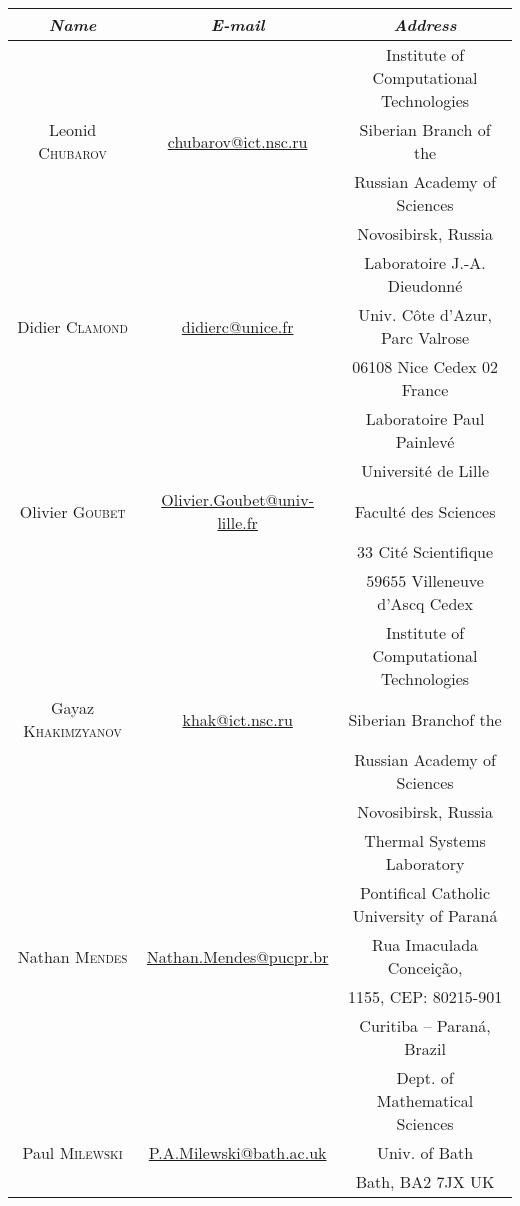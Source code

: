 \documentclass[final, a4paper, oneside, 12pt]{article}
\numberwithin{equation}{section}
\begin{document}
\bigskip

\begin{adjustwidth}{-1cm}{}
\begin{tabular}{ccc}
\hline\hline
\textit{Name} & \textit{E-mail} & \textit{Address} \\
\hline\hline 
& & Institute of Computational Technologies \\
Leonid \textsc{Chubarov} & \href{mailto:chubarov@ict.nsc.ru}{chubarov@ict.nsc.ru} & Siberian Branch of the \\
& & Russian Academy of Sciences \\
& & Novosibirsk, Russia \\
\hline
 & & Laboratoire J.-A. Dieudonn\'e \\
Didier \textsc{Clamond} & \href{mailto:didierc@unice.fr}{didierc@unice.fr} & Univ. C\^ote d'Azur, Parc Valrose \\
& & 06108 Nice Cedex 02 France \\
\hline
& & Laboratoire Paul Painlev\'e \\
& & Universit\'e de Lille \\
Olivier \textsc{Goubet} & \href{mailto:Olivier.Goubet@univ-lille.fr}{Olivier.Goubet@univ-lille.fr} & Facult\'e des Sciences \\
& & $33$ Cit\'e Scientifique \\
& & $59655$ Villeneuve d'Ascq Cedex​ \\
\hline
& & Institute of Computational Technologies \\
Gayaz \textsc{Khakimzyanov} & \href{mailto:khak@ict.nsc.ru}{khak@ict.nsc.ru} & Siberian Branchof the \\
& & Russian Academy of Sciences \\
& & Novosibirsk, Russia \\
\hline
& & Thermal Systems Laboratory \\
& & Pontifical Catholic University of Paran\'a \\
Nathan \textsc{Mendes} & \href{mailto:nathan.mendes@pucpr.br}{Nathan.Mendes@pucpr.br} & Rua Imaculada Concei\c{c}\~{a}o, \\
& & 1155, CEP: 80215-901 \\
& & Curitiba -- Paran\'a, Brazil \\
\hline
 & & Dept. of Mathematical Sciences \\
Paul \textsc{Milewski} & \href{mailto:P.A.Milewski@bath.ac.uk}{P.A.Milewski@bath.ac.uk} & Univ. of Bath \\
& & Bath, BA2 7JX UK \\
\hline\hline
\end{tabular}
\end{adjustwidth}
\end{document}
